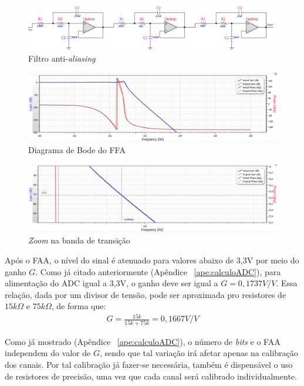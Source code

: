 \documentclass[
	12pt,				%
	openright,			%
	twoside,			%
	a4paper,			%
	english,			%
	french,				%
	spanish,			%
	brazil,				%
	]{abntex2}
\begin{document}
		\begin{figure}[!ht]
			\centering
			\includegraphics[width=\linewidth]{../Fotos/filterPro.png}
			\caption{Filtro anti-\textit{aliasing}}
			\label{fig:circuitoFAA}
		\end{figure}

		\begin{figure}[!ht]
			\centering
			\includegraphics[width=\linewidth]{../Fotos/filterProGF.png}
			\caption{Diagrama de Bode do FFA}
			\label{fig:faaDiagramaBode}
		\end{figure}

		\begin{figure}[!ht]
			\centering
			\includegraphics[width=\linewidth]{../Fotos/filterProZoom.png}
			\caption{\textit{Zoom} na banda de transição}
			\label{fig:faaDiagramaBodeZoom}
		\end{figure}

		Após o FAA, o nível do sinal é atenuado para valores abaixo de
		3,3V por meio do ganho $G$. Como já citado anteriormente (Apêndice ~\ref{ape:calculoADC}), para
		alimentação do ADC igual a 3,3V, o ganho deve ser igual a $G =
		0,1737V/V$. Essa relação, dada por um divisor de tensão, pode
		ser aproximada pro resistores de $15k\Omega$ e $75k\Omega$, de
		forma que:
		\begin{gather*}
			G = \frac{15k}{15k+75k} = 0,1667V/V
		\end{gather*}

		Como já mostrado (Apêndice ~\ref{ape:calculoADC}), o número de \textit{bits} e o FAA independem do valor
		de $G$, sendo que tal variação irá afetar apenas na calibração dos
		canais. Por tal calibração já fazer-se necessária, também é
		dispensável o uso de resistores de precisão, uma vez que cada
		canal será calibrado individualmente.
\end{document}
